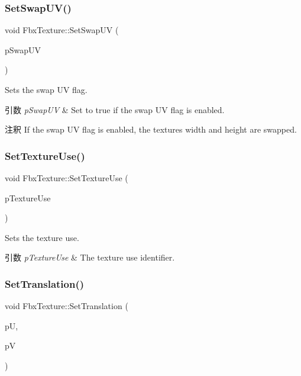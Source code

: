 \subsubsection{\texorpdfstring{Set\+Swap\+U\+V()}{SetSwapUV()}}
{\footnotesize\ttfamily void Fbx\+Texture\+::\+Set\+Swap\+UV (\begin{DoxyParamCaption}\item[{bool}]{p\+Swap\+UV }\end{DoxyParamCaption})}

Sets the swap UV flag. 
\begin{DoxyParams}{引数}
{\em p\+Swap\+UV} & Set to {\ttfamily true} if the swap UV flag is enabled. \\
\hline
\end{DoxyParams}
\begin{DoxyRemark}{注釈}
If the swap UV flag is enabled, the texture\textquotesingle{}s width and height are swapped. 
\end{DoxyRemark}
\mbox{\label{class_fbx_texture_aa1bb097d19a2b92f64abde250388df0d}} 
\subsubsection{\texorpdfstring{Set\+Texture\+Use()}{SetTextureUse()}}
{\footnotesize\ttfamily void Fbx\+Texture\+::\+Set\+Texture\+Use (\begin{DoxyParamCaption}\item[{\hyperlink{class_fbx_texture_af034d10e711237dd9ae92a5965787f25}{E\+Texture\+Use}}]{p\+Texture\+Use }\end{DoxyParamCaption})}

Sets the texture use. 
\begin{DoxyParams}{引数}
{\em p\+Texture\+Use} & The texture use identifier. \\
\hline
\end{DoxyParams}
\mbox{\label{class_fbx_texture_aeeaecd1f6dbbe08fcf2e77b56a0e97f4}} 
\subsubsection{\texorpdfstring{Set\+Translation()}{SetTranslation()}}
{\footnotesize\ttfamily void Fbx\+Texture\+::\+Set\+Translation (\begin{DoxyParamCaption}\item[{double}]{pU,  }\item[{double}]{pV }\end{DoxyParamCaption})}

